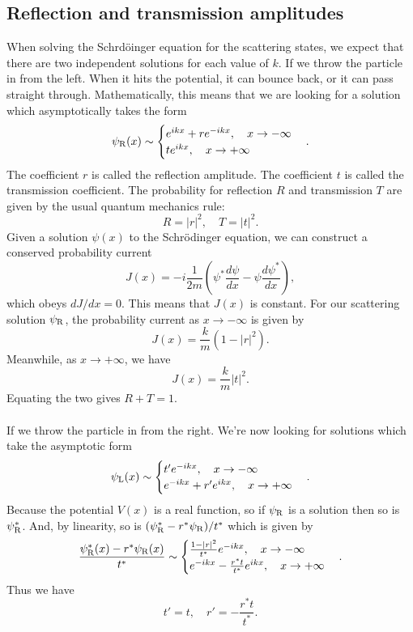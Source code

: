 \subsection{Reflection and transmission amplitudes}
When solving the Schrd\"{o}inger equation for the scattering states, we expect that there are two independent solutions for each value of $k$.
If we throw the particle in from the left. When it hits the potential, it can bounce back, or it can pass straight through. 
Mathematically, this means that we are looking for a solution which asymptotically takes the form
\[\psi_{\rm R}(x) \sim \begin{cases} e^{ikx} + re^{-ikx} , \quad x \to -\infty \\ te^{ikx} , \quad x \to +\infty \end{cases}.\]
The coefficient $r$ is called the reflection amplitude. The coefficient $t$ is called the transmission coefficient. The probability for reflection $R$ and transmission $T$ are given by the usual quantum mechanics rule:
\[R = |r|^2 , \quad T = |t|^2.\]
Given a solution $\psi(x)$ to the Schr\"{o}dinger equation, we can construct a conserved probability current
\[J(x) = -i\frac{1}{2m}\left( \psi^*\frac{d\psi}{dx} - \psi\frac{d\psi^*}{dx}\right),\]
which obeys $dJ/dx = 0$. This means that $J(x)$ is constant. For our scattering solution $\psi_{\rm R}$, the probability current as $x\to-\infty$ is given by
\[J(x) = \frac{k}{m}(1-|r|^2).\]
Meanwhile, as $x \to +\infty$, we have
\[J(x) = \frac{k}{m} |t|^2.\]
Equating the two gives $R + T =1$.
\\ \\
If we throw the particle in from the right. We're now looking for solutions which take the asymptotic form
\[\psi_{\rm L}(x) \sim \begin{cases} t'e^{-ikx}  , \quad x \to -\infty \\ e^{-ikx} + r'e^{ikx} , \quad x \to +\infty \end{cases}.\]
Because the potential $V (x) $ is a real function, so if $\psi_{\rm R}$ is a solution then so is $\psi^*_{\rm R}$. And, by linearity, so is $(\psi^*_{\rm R} - r^*\psi_{\rm R}) / t^* $ which is given by
\[\frac{\psi^*_{\rm R}(x) - r^*\psi_{\rm R}(x)}{t^*} \sim \begin{cases} \frac{1-|r|^2}{t^*} e^{-ikx}  , \quad x \to -\infty \\ e^{-ikx} - \frac{r^* t}{t^*}e^{ikx} , \quad x \to +\infty \end{cases}.\]
Thus we have
\[t' = t , \quad r' = -\frac{r^* t}{t^*}.\]

